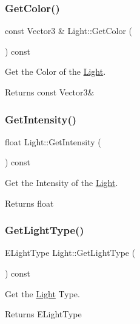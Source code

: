 \subsubsection{\texorpdfstring{Get\+Color()}{GetColor()}}
{\footnotesize\ttfamily const Vector3 \& Light\+::\+Get\+Color (\begin{DoxyParamCaption}{ }\end{DoxyParamCaption}) const}



Get the Color of the \hyperlink{classLight}{Light}. 

\begin{DoxyReturn}{Returns}
const Vector3\& 
\end{DoxyReturn}
\mbox{\label{classLight_a3df6df8d3503e59227f626380b4d7a29}} 
\subsubsection{\texorpdfstring{Get\+Intensity()}{GetIntensity()}}
{\footnotesize\ttfamily float Light\+::\+Get\+Intensity (\begin{DoxyParamCaption}{ }\end{DoxyParamCaption}) const}



Get the Intensity of the \hyperlink{classLight}{Light}. 

\begin{DoxyReturn}{Returns}
float 
\end{DoxyReturn}
\mbox{\label{classLight_ad825d936b6213b8cf49a6a2bd9516b1a}} 
\subsubsection{\texorpdfstring{Get\+Light\+Type()}{GetLightType()}}
{\footnotesize\ttfamily E\+Light\+Type Light\+::\+Get\+Light\+Type (\begin{DoxyParamCaption}{ }\end{DoxyParamCaption}) const}



Get the \hyperlink{classLight}{Light} Type. 

\begin{DoxyReturn}{Returns}
E\+Light\+Type 
\end{DoxyReturn}
\mbox{\label{classLight_a5183e96f3b976edc679456856c480d17}} 
